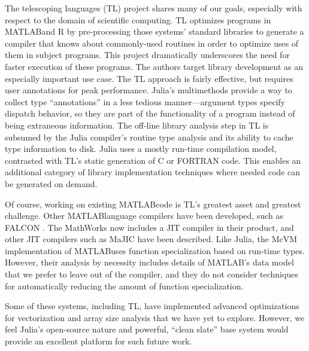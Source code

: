 The telescoping languages (TL) project \cite{telescoping} shares many of our
goals, especially with respect to the domain of scientific computing.
TL optimizes programs in MATLAB\textregistered and
R by pre-processing those systems' standard libraries to
generate a compiler that knows about commonly-used routines in order
to optimize uses of them in subject programs. This project dramatically
underscores the need for faster execution of these programs. The authors
target library development as an especially important use case. The
TL approach is fairly effective, but requires user
annotations for peak performance. Julia's multimethods provide a way to
collect type ``annotations'' in a less tedious manner---argument types
specify dispatch behavior, so they are part of the functionality of a program
instead of being extraneous information. The off-line library analysis step in
TL is subsumed by the Julia compiler's routine
type analysis and its ability to cache type information to disk. Julia
uses a mostly run-time compilation model, contrasted with TL's static
generation of C or FORTRAN code. This enables an additional category of
library implementation techniques where needed code can be generated on demand.

Of course, working on existing MATLAB\textregistered code is TL's greatest
asset and greatest challenge. Other MATLAB\textregistered language compilers
have been developed, such as FALCON \cite{falcon}. The MathWorks now
includes a JIT compiler in their product, and other JIT compilers such
as MaJIC \cite{majic} have been described.
Like Julia, the McVM \cite{matlabspecializer} implementation of
MATLAB\textregistered uses function specialization based on run-time types.
However, their analysis by necessity includes details of
MATLAB\textregistered's data model that we prefer to leave out of the
compiler, and they do not consider techniques
for automatically reducing the amount of function specialization.

Some of these systems, including TL,
have implemented advanced optimizations
for vectorization \cite{telescopingvectorization} and array size analysis
\cite{slicehoisting} that we have yet to explore. However, we feel Julia's
open-source nature and powerful, ``clean slate'' base system would provide
an excellent platform for such future work.


